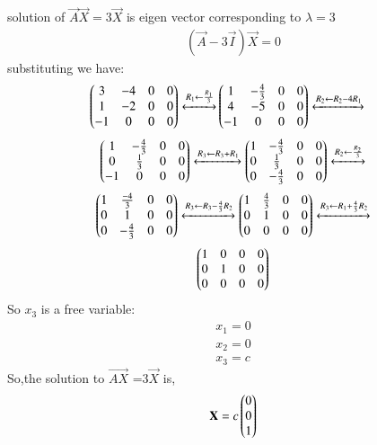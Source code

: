 \documentclass[journal,12pt,twocolumn]{IEEEtran}
\begin{document}
 solution of $\vec{A}\vec{X}=3\vec{X}$ is eigen vector corresponding to $\lambda=3$ 
 \begin{align}\label{eq11}
(\vec{A}-3\vec{I})\vec X=0
\end{align}
substituting we have:
\begin{align}
\begin{pmatrix}3& -4&0&0\\
1 & -2 & 0&0\\
-1 & 0 &0&0
\end{pmatrix}
\xleftrightarrow[]{R_1 \leftarrow \frac{R_1}{3} }\nonumber
&
\begin{pmatrix}1&-\frac{4}{3}&0&0\\
4&-5&0&0\\
-1&0&0&0\end{pmatrix}\xleftrightarrow[]{R_2 \leftarrow R_2-4R_1} 
\end{align}
\begin{align}
    \begin{pmatrix}1&-\frac{4}{3}&0&0\\
            0&\frac{1}{3}&0&0\\
            -1&0&0&0\end{pmatrix}
    \xleftrightarrow[]{R_3 \leftarrow R_3+R_1 }\nonumber
    \begin{pmatrix}1&-\frac{4}{3}&0&0\\
            0&\frac{1}{3}&0&0\\
            0&-\frac{4}{3}&0&0\end{pmatrix}
            \xleftrightarrow[]{R_2 \leftarrow\frac{R_2}{3} }\nonumber
\end{align}
\begin{align}
    \begin{pmatrix}1&\frac{-4}{3}&0&0\\
    0&1&0&0\\
    0&-\frac{4}{3}&0&0\end{pmatrix}
    \xleftrightarrow[]{R_3 \leftarrow R_3-\frac{4}{3}R_2} \nonumber
    \begin{pmatrix}1&\frac{4}{3}&0&0\\
           0&1&0&0\\
         0&0&0&0\end{pmatrix}    \nonumber
          \xleftrightarrow[]{R_3 \leftarrow R_1+\frac{4}{3}R_2}
\end{align}
\begin{align} \label{eq:eq_15}
    \begin{pmatrix}1&0&0&0\\
    0&1&0&0\\
    0&0&0&0\end{pmatrix} 
\end{align}
So $x_3$ is a free variable:
\begin{align}
  x_1=0\\
  x_2=0\\
  x_3=c
\end{align}
 So,the solution to $\vec {AX}$ =3$\vec{X}$ is,
 \begin{align}\label{eq:222}
 \mathbf{X} =
 c
 \begin{pmatrix}
 0\\0\\1
 \end{pmatrix}
 \end{align}
\end{document}
